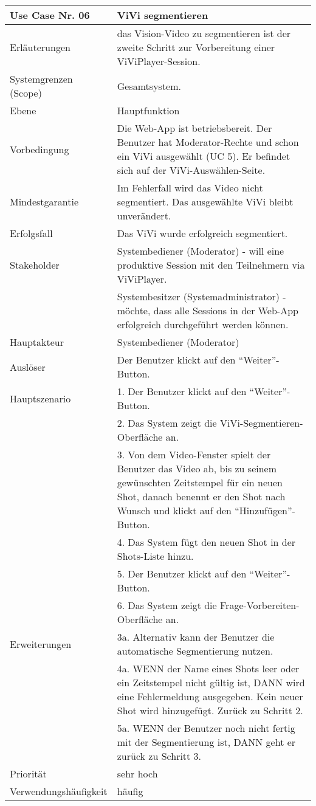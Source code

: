 \begin{tabularx}{\linewidth}{|l|X|}
	\hline
	Use Case Nr. 06			& \textbf{ViVi segmentieren} \\ \hline
	Erläuterungen			& das Vision-Video zu segmentieren ist der zweite Schritt zur
							  Vorbereitung einer ViViPlayer-Session. \\ \hline
	Systemgrenzen (Scope)	& Gesamtsystem. \\ \hline
	Ebene					& Hauptfunktion \\ \hline
	Vorbedingung			& Die Web-App ist betriebsbereit. Der Benutzer hat 
	                          Moderator-Rechte und schon ein ViVi ausgewählt (UC 5). Er befindet sich auf der ViVi-Auswählen-Seite. \\ \hline
	Mindestgarantie			& Im Fehlerfall wird das Video nicht segmentiert. Das ausgewählte 
							  ViVi bleibt unverändert. \\ \hline
	Erfolgsfall 			& Das ViVi wurde erfolgreich segmentiert. \\ \hline
	Stakeholder				& Systembediener (Moderator) - will eine produktive Session mit den 
	                          Teilnehmern via ViViPlayer. \\
							& Systembesitzer (Systemadministrator) - möchte, dass alle Sessions 
							  in der Web-App erfolgreich durchgeführt werden können. \\ \hline
	Hauptakteur				& Systembediener (Moderator) \\ \hline
	Auslöser				& Der Benutzer klickt auf den ``Weiter''-Button. \\ \hline	
	Hauptszenario			& 1. Der Benutzer klickt auf den ``Weiter''-Button. \\
							& 2. Das System zeigt die ViVi-Segmentieren-Oberfläche an. \\
							& 3. Von dem Video-Fenster spielt der Benutzer das Video ab, bis 
							  zu seinem gewünschten Zeitstempel für ein neuen Shot, danach
							  benennt er den Shot nach Wunsch und klickt auf den ``Hinzufügen''-Button. \\
							& 4. Das System fügt den neuen Shot in der Shots-Liste
							  hinzu. \\
							& 5. Der Benutzer klickt auf den ``Weiter''-Button. \\
							& 6. Das System zeigt die Frage-Vorbereiten-Oberfläche an. \\ \hline
	Erweiterungen			& 3a. Alternativ kann der Benutzer die automatische 
							  Segmentierung nutzen. \\
							& 4a. WENN der Name eines Shots leer oder ein Zeitstempel
							  nicht gültig ist, DANN wird eine Fehlermeldung ausgegeben. Kein neuer Shot wird hinzugefügt. Zurück zu Schritt 2. \\
							& 5a. WENN der Benutzer noch nicht fertig mit der Segmentierung
							  ist, DANN geht er zurück zu Schritt 3. \\ \hline
	Priorität				& sehr hoch \\ \hline
	Verwendungshäufigkeit	& häufig \\ \hline
\end{tabularx}